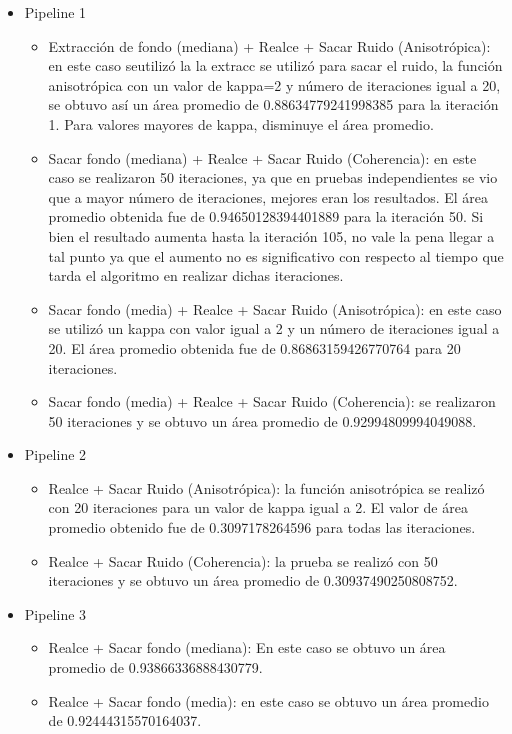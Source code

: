 \begin{itemize}
	\item Pipeline 1
		\begin{itemize}
			\item	Extracci\'on de fondo (mediana) + Realce + Sacar Ruido (Anisotrópica): en este caso seutiliz\'o la la extracc se utilizó para 	sacar el ruido, la función anisotrópica con un valor de kappa=2 y número de iteraciones igual a 20, se obtuvo así un área promedio de 0.88634779241998385 para la iteración 1. Para valores mayores de kappa, disminuye el área promedio.
			\item	Sacar fondo (mediana) + Realce + Sacar Ruido (Coherencia): en este caso se realizaron 50 iteraciones, ya que en pruebas independientes se vio que a mayor número de iteraciones, mejores eran los resultados. El área promedio obtenida fue de 0.94650128394401889 para la iteración 50. Si bien el resultado aumenta hasta la iteración 105, no vale la pena llegar a tal punto ya que el aumento no es significativo con respecto al tiempo que tarda el algoritmo en realizar dichas iteraciones.
			\item Sacar fondo (media) + Realce + Sacar Ruido (Anisotrópica): en este caso se utilizó un kappa con valor igual a 2 y un número de iteraciones igual a 20. El área promedio obtenida fue de 	 	0.86863159426770764 para 20 iteraciones.
			\item Sacar fondo (media) + Realce + Sacar Ruido (Coherencia): se realizaron 50 iteraciones y se obtuvo un área promedio de 0.92994809994049088.
	\end{itemize}
	\item Pipeline 2
		\begin{itemize}
			\item Realce + Sacar Ruido (Anisotrópica): la función anisotrópica se realizó con 20 iteraciones para un valor de kappa igual a 2. El valor de área promedio obtenido fue de 0.3097178264596 para todas las iteraciones.
			\item	Realce + Sacar Ruido (Coherencia): la prueba se realizó con 50 iteraciones y se obtuvo un área promedio de  0.30937490250808752.
		\end{itemize}
	\item Pipeline 3
		\begin{itemize}
			\item Realce + Sacar fondo (mediana): En este caso se obtuvo un área promedio de 0.93866336888430779.
			\item Realce + Sacar fondo (media): en este caso se obtuvo un área promedio de 0.92444315570164037.

\end{itemize}
\end{itemize}
